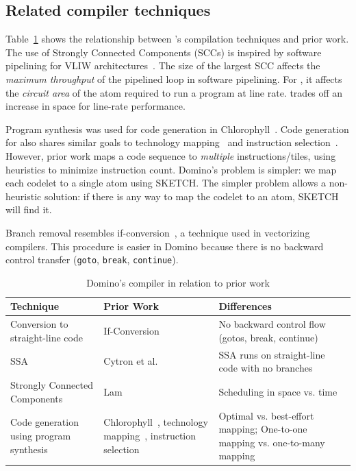 
\subsection{Related compiler techniques}
\label{ss:related_compiler}
Table~\ref{tab:prior_compiler} shows the relationship between \pktlanguage's
compilation techniques and prior work. The use of Strongly Connected Components
(SCCs) is inspired by software pipelining for VLIW
architectures~\cite{software_pipelining}. The size of the largest SCC affects
the {\em maximum throughput} of the pipelined loop in software pipelining. For
\pktlanguage, it affects the {\em circuit area} of the atom required to run a
program at line rate. \pktlanguage trades off an increase in space for
line-rate performance.

Program synthesis was used for code generation in
Chlorophyll~\cite{chlorophyll}.  Code generation for \pktlanguage also shares
similar goals to technology mapping~\cite{micheli} and
instruction selection~\cite{muchnik}.  However, prior work maps a code sequence
to \textit{multiple} instructions/tiles, using heuristics to minimize
instruction count. Domino's problem is simpler: we map each codelet to a single
atom using SKETCH.  The simpler problem allows a non-heuristic solution: if
there is any way to map the codelet to an atom, SKETCH will find it.

Branch removal resembles if-conversion~\cite{if_conversion}, a
technique used in vectorizing compilers. This procedure is easier in Domino
because there is no backward control transfer ({\tt goto}, {\tt break},
{\tt continue}).

\begin{table}[!t]
  \begin{scriptsize}
    \begin{tabular}{|p{}|p{}|p{}|}
  \hline
  Technique & Prior Work & Differences \\
  \hline
  Conversion to straight-line code & If-Conversion~\cite{if_conversion} & No backward control flow (gotos, break, continue) \\
  \hline
  SSA & Cytron et al.~\cite{ssa} & SSA runs on straight-line code with no branches \\
  \hline
  Strongly Connected Components & Lam~\cite{software_pipelining} & Scheduling in space vs. time \\
  \hline
  Code generation using program synthesis & Chlorophyll~\cite{chlorophyll}, technology mapping~\cite{micheli}, instruction selection~\cite{muchnik} & Optimal vs. best-effort mapping; One-to-one mapping vs. one-to-many mapping \\
  \hline
  \end{tabular}
  \end{scriptsize}
  \caption{Domino's compiler in relation to prior work}
  \label{tab:prior_compiler}
\end{table}
